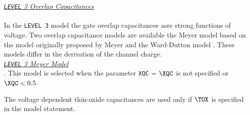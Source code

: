 \noindent\underline{\sl \large {\tt LEVEL} 3 Overlap Capacitances}\\[0.1in]
  
 
\\[0.1in]
   In the
{\tt LEVEL 3} model the gate overlap capacitances asre strong
functions of voltage. Two overlap capacitance models are available
the Meyer model based on the model originally proposed by Meyer
\cite{meyer:71} and the Ward-Dutton model
\cite{ward:dutton:78,oh:ward:80}. These models differ in the
derivation of the
channel charge.\\[0.2in]

\noindent\underline{\sl \large {\tt LEVEL} 3 Meyer Model}\\[0.1in]
  
 
 . This model is
selected when the parameter {\tt XQC} = $\XQC$ is not specified or
$\XQC < 0.5$.

The voltage dependent thin-oxide capacitances are used only if
$\TOX$ is specified in the model statement.

